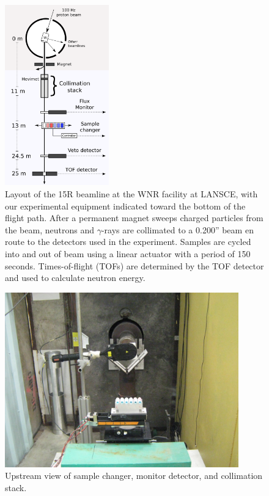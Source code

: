 \begin{figure}[tb]
    \centering
    \includegraphics[width=0.4\textwidth]{figures/ExperimentalSetup.png}
    \caption[Layout of the 15R beamline at the WNR facility at LANSCE]
    {Layout of the 15R beamline at the WNR facility at LANSCE, with our
        experimental equipment indicated toward the bottom of the flight path.
        After a permanent magnet sweeps charged particles from the beam, neutrons and
        $\gamma$-rays are collimated to a 0.200'' beam en route to the
        detectors used in the experiment. Samples are cycled into and out of beam
        using a linear actuator with a period of 150 seconds. Times-of-flight (TOFs) are
        determined by the TOF detector and used to calculate neutron energy.
    }
    \label{ExperimentalApparatus}
\end{figure}
\begin{figure}[tb]
    \centering
    \includegraphics[width=0.9\textwidth]{figures/UpstreamTowardCollimator.jpg}
    \caption[Sample changer, monitor detector, and collimation stack]
    {Upstream view of sample changer, monitor detector, and collimation stack.}
    \label{BeamlineSampleChanger}
\end{figure}
